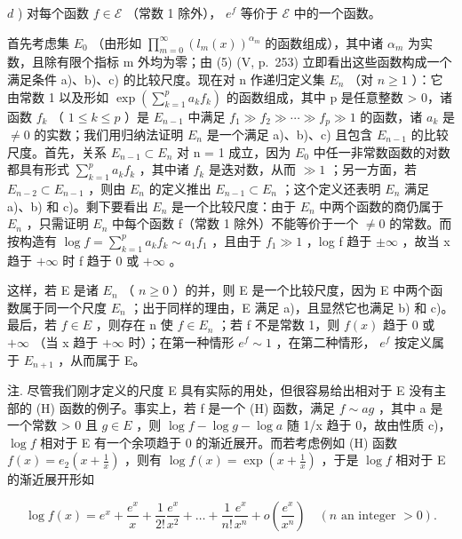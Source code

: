 \(d\) ) 对每个函数 \(f \in \mathcal{E}\) （常数 1 除外）， \(e^f\) 等价于 \(\mathcal{E}\) 中的一个函数。

首先考虑集 \(E_{0}\) （由形如 \(\prod_{m=0}^{\infty}\left(l_{m}(x)\right)^{\alpha_{m}}\) 的函数组成），其中诸 \(\alpha_{m}\) 为实数，且除有限个指标 m 外均为零；由 (5) (V, p.~253) 立即看出这些函数构成一个满足条件 a)、b)、c) 的比较尺度。现在对 n 作递归定义集 \(E_{n}\) （对 \(n \geqslant 1\) ）：它由常数 1 以及形如 \(\exp\left(\sum_{k=1}^{p}a_{k}f_{k}\right)\) 的函数组成，其中 p 是任意整数 \textgreater{} 0，诸函数 \(f_{k}\) （ \(1 \leqslant k \leqslant p\) ）是 \(E_{n-1}\) 中满足 \(f_{1} \gg f_{2} \gg \cdots \gg f_{p} \gg 1\) 的函数，诸 \(a_{k}\) 是 \(\neq 0\) 的实数；我们用归纳法证明 \(E_{n}\) 是一个满足 a)、b)、c) 且包含 \(E_{n-1}\) 的比较尺度。首先，关系 \(E_{n-1} \subset E_{n}\) 对 n = 1 成立，因为 \(E_{0}\) 中任一非常数函数的对数都具有形式 \(\sum_{k=1}^{p}a_{k}f_{k}\) ，其中诸 \(f_{k}\) 是迭对数，从而 \(\gg 1\) ；另一方面，若 \(E_{n-2} \subset E_{n-1}\) ，则由 \(E_{n}\) 的定义推出 \(E_{n-1} \subset E_{n}\) ；这个定义还表明 \(E_{n}\) 满足 a)、b) 和 c)。剩下要看出 \(E_{n}\) 是一个比较尺度：由于 \(E_{n}\) 中两个函数的商仍属于 \(E_{n}\) ，只需证明 \(E_{n}\) 中每个函数 f（常数 1 除外）不能等价于一个 \(\neq 0\) 的常数。而按构造有 \(\log f = \sum_{k=1}^{p}a_{k}f_{k} \sim a_{1}f_{1}\) ，且由于 \(f_{1} \gg 1\) ，log f 趋于 \(\pm\infty\) ，故当 x 趋于 \(+\infty\) 时 f 趋于 0 或 \(+\infty\) 。

这样，若 E 是诸 \(E_{n}\) （ \(n \geqslant 0\) ）的并，则 E 是一个比较尺度，因为 E 中两个函数属于同一个尺度 \(E_{n}\) ；出于同样的理由，E 满足 a)，且显然它也满足 b) 和 c)。最后，若 \(f \in E\) ，则存在 n 使 \(f \in E_{n}\) ；若 f 不是常数 1，则 \(f(x)\) 趋于 0 或 \(+\infty\) （当 x 趋于 \(+\infty\) 时）；在第一种情形 \(e^{f} \sim 1\) ，在第二种情形， \(e^{f}\) 按定义属于 \(E_{n+1}\) ，从而属于 E。

注. 尽管我们刚才定义的尺度 E 具有实际的用处，但很容易给出相对于 E 没有主部的 (H) 函数的例子。事实上，若 f 是一个 (H) 函数，满足 \(f \sim ag\) ，其中 a 是一个常数 \textgreater{} 0 且 \(g \in E\) ，则 \(\log f - \log g - \log a\) 随 1/x 趋于 0，故由性质 c)， \(\log f\) 相对于 E 有一个余项趋于 0 的渐近展开。而若考虑例如 (H) 函数 \(f(x) = e_{2}\left(x + \frac{1}{x}\right)\) ，则有 \(\log f(x) = \exp\left(x + \frac{1}{x}\right)\) ，于是 \(\log f\) 相对于 E 的渐近展开形如

\[
\log f (x) = e ^ {x} + \frac {e ^ {x}}{x} + \frac {1}{2 !} \frac {e ^ {x}}{x ^ {2}} + \dots + \frac {1}{n !} \frac {e ^ {x}}{x ^ {n}} + o \left(\frac {e ^ {x}}{x ^ {n}}\right) \quad (n \text {   an   integer   } > 0).
\]

